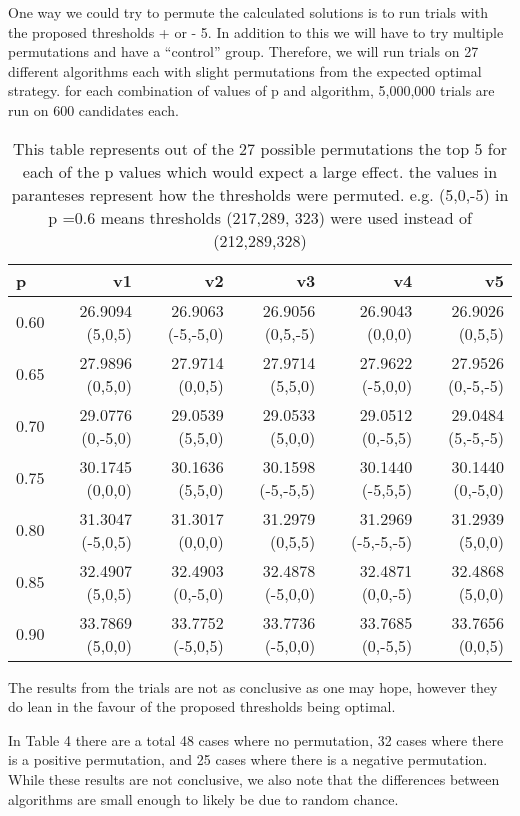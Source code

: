 \documentclass[a4paper,11pt]{article}
\begin{document}
One way we could try to permute the calculated solutions is to run trials with the proposed thresholds + or - 5. In addition to this we will have to try multiple permutations and have a ``control'' group. Therefore, we will run trials on 27 different algorithms each with slight permutations from the expected optimal strategy. for each combination of values of p and algorithm, 5,000,000 trials are run on 600 candidates each.

\begin{table}[ht]
\centering
\begin{tabular}{lrrrrr}
\hline
p & v1 & v2 & v3 & v4 & v5 \\
\hline
0.60 & 26.9094 (5,0,5) & 26.9063 (-5,-5,0) & 26.9056 (0,5,-5) & 26.9043 (0,0,0) & 26.9026 (0,5,5) \\
0.65 & 27.9896 (0,5,0) & 27.9714 (0,0,5) & 27.9714 (5,5,0) & 27.9622 (-5,0,0) & 27.9526 (0,-5,-5) \\
0.70 & 29.0776 (0,-5,0) & 29.0539 (5,5,0) & 29.0533 (5,0,0) & 29.0512 (0,-5,5) & 29.0484 (5,-5,-5) \\
0.75 & 30.1745 (0,0,0) & 30.1636 (5,5,0) & 30.1598 (-5,-5,5) & 30.1440 (-5,5,5) & 30.1440 (0,-5,0) \\
0.80 & 31.3047 (-5,0,5) & 31.3017 (0,0,0) & 31.2979 (0,5,5) & 31.2969 (-5,-5,-5) & 31.2939 (5,0,0) \\
0.85 & 32.4907 (5,0,5) & 32.4903 (0,-5,0) & 32.4878 (-5,0,0) & 32.4871 (0,0,-5) & 32.4868 (5,0,0) \\
0.90 & 33.7869 (5,0,0) & 33.7752 (-5,0,5) & 33.7736 (-5,0,0) & 33.7685 (0,-5,5) & 33.7656 (0,0,5) \\
\hline
\end{tabular}
\caption{This table represents out of the 27 possible permutations the top 5 for each of the p values which would expect a large effect. the values in paranteses represent how the thresholds were permuted. e.g. (5,0,-5) in p =0.6 means thresholds (217,289, 323) were used instead of (212,289,328)}
\end{table}

The results from the trials are not as conclusive as one may hope, however they do lean in the favour of the proposed thresholds being optimal. 

In Table 4 there are a total 48 cases where no permutation, 32 cases where there is a positive permutation, and 25 cases where there is a negative permutation. While these results are not conclusive, we also note that the differences between algorithms are small enough to likely be due to random chance. 
\end{document}
